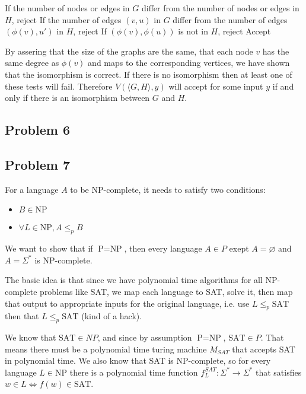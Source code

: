 \documentclass[english]{article}
\begin{document}
\begin{algorithmic}
\State If the number of nodes or edges in $G$ differ from the number of nodes
		or edges in $H$, reject
	\State If the number of edges $(v,u)$ in $G$ differ from the number of
			edges $(\phi(v),u')$ in $H$, reject
		\State If $(\phi(v),\phi(u))$ is not in $H$, reject
	\EndFor
\EndFor
\State Accept
\EndFunction 
\end{algorithmic}

By assering that the size of the graphs are the same, that each node $v$ has
the same degree as $\phi(v)$ and maps to the corresponding vertices, we have
shown that the isomorphism is correct. If there is no isomorphism then at
least one of these tests will fail. Therefore $V(\langle G, H \rangle,y)$
will accept for some input $y$ if and only if there is an isomorphism between
$G$ and $H$.

\subsection*{Problem 6}

\subsection*{Problem 7}
For a language $A$ to be NP-complete, it needs to satisfy two conditions:
\begin{itemize}
\item $B \in \textrm{NP}$
\item $\forall L \in \textrm{NP}, A \le_p B$
\end{itemize}
We want to show that if $\textrm{P} = \textrm{NP}$, then every language
$A \in P$ exept $A = \varnothing$ and $A = \Sigma^*$ is NP-complete. 

The basic idea is that since we have polynomial time algorithms for all
NP-complete problems like SAT, we map each language to SAT, solve it, then map
that output to appropriate inputs for the original language, i.e. use
$L \le_p \textrm{SAT}$ then that $L \le_p \textrm{SAT}$ (kind of a hack). 

We know that $\textrm{SAT} \in NP$, and since by assumption
$\textrm{P} = \textrm{NP}$, $\textrm{SAT} \in P$. That means there must be a
polynomial time turing machine $M_{SAT}$ that accepts SAT in polynomial time.
We also know that SAT is NP-complete, so for every language $L \in \textrm{NP}$
there is a polynomial time function $f^{SAT}_L : \Sigma^* \rightarrow \Sigma^*$
that satisfies $w \in L \iff f(w) \in \textrm{SAT}$.
\end{document}
